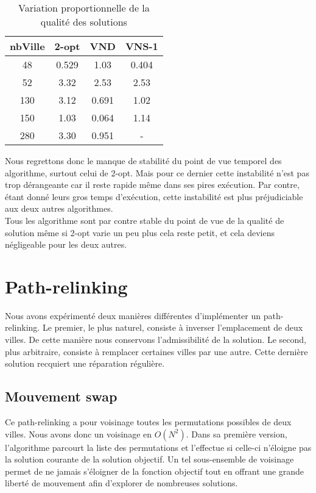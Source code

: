\documentclass[12pt,a4paper]{article}
\begin{document}
\begin{table}[!h]
\centering
\begin{tabular}{|*{4}{c|}}
  \hline
  nbVille & 2-opt & VND & VNS-1 \\
  \hline
  48 & 0.529 & 1.03 & 0.404 \\
  52 & 3.32 & 2.53 & 2.53 \\
  130 & 3.12 & 0.691 & 1.02 \\
  150 & 1.03 & 0.064 & 1.14 \\
  280 & 3.30 & 0.951 & - \\
  \hline
\end{tabular}
\caption{Variation proportionnelle de la qualité des solutions}
\label{vartempsGRASP}
\end{table}

Nous regrettons donc le manque de stabilité du point de vue temporel des algorithme, surtout celui de 2-opt. Mais pour ce dernier cette instabilité n'est pas trop dérangeante car il reste rapide même dans ses pires exécution. Par contre, étant donné leurs gros temps d’exécution, cette instabilité est plus préjudiciable aux deux autres algorithmes.\\

Tous les algorithme sont par contre stable du point de vue de la qualité de solution même si 2-opt varie un peu plus cela reste petit, et cela deviens négligeable pour les deux autres.

\section{Path-relinking}

Nous avons expérimenté deux manières différentes d'implémenter un path-relinking. Le premier, le plus naturel, consiste à inverser l'emplacement de deux villes. De cette manière nous conservons l'admissibilité de la solution. Le second, plus arbitraire, consiste à remplacer certaines villes par une autre. Cette dernière solution recquiert une réparation régulière.

\subsection{Mouvement swap}

Ce path-relinking a pour voisinage toutes les permutations possibles de deux villes. Nous avons donc un voisinage en $O(N^2)$. Dans sa première version, l'algorithme parcourt la liste des permutations et l'effectue si celle-ci n'éloigne pas la solution courante de la solution objectif. Un tel sous-ensemble de voisinage permet de ne jamais s'éloigner de la fonction objectif tout en offrant une grande liberté de mouvement afin d'explorer de nombreuses solutions.\\
\end{document}
